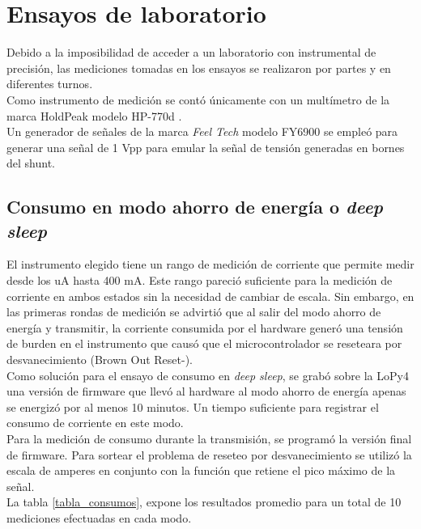 \section{Ensayos de laboratorio}
Debido a la imposibilidad de acceder a un laboratorio con instrumental de precisión, las mediciones tomadas en los ensayos se realizaron por partes y en diferentes turnos.\\
Como instrumento de medición se contó únicamente con un multímetro de la marca HoldPeak modelo HP-770d \citep{hp770d}.\\
Un generador de señales de la marca \textit{Feel Tech} modelo FY6900 se empleó para generar una señal de 1 Vpp para emular la señal de tensión generadas en bornes del shunt.
\subsection{Consumo en modo ahorro de energía o \textit{deep sleep}}
El instrumento elegido tiene un rango de medición de corriente que permite medir desde los uA hasta 400 mA. Este rango pareció suficiente para la medición de corriente en ambos estados sin la necesidad de cambiar de escala. Sin embargo, en las primeras rondas de medición se advirtió que al salir del modo ahorro de energía y transmitir, la corriente consumida por el hardware generó una tensión de burden en el instrumento que causó que el microcontrolador se reseteara por desvanecimiento (Brown Out Reset-).\\
Como solución para el ensayo de consumo en \textit{deep sleep}, se grabó sobre la LoPy4 una versión de firmware que llevó al hardware al modo ahorro de energía apenas se energizó por al menos 10 minutos. Un tiempo suficiente para registrar el consumo de corriente en este modo.\\
Para la medición de consumo durante la transmisión, se programó la versión final de firmware. Para sortear el problema de reseteo por desvanecimiento se utilizó la escala de amperes en conjunto con la función que retiene el pico máximo de la señal.\\
La tabla \ref{tabla_consumos}, expone los resultados promedio para un total de 10 mediciones efectuadas en cada modo.\\
